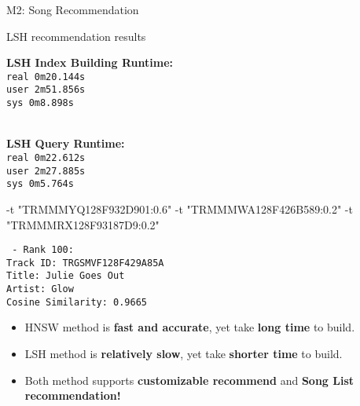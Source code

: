 \documentclass{beamer}
\begin{document}
\begin{section}{M2: Song Recommendation}
\begin{frame}[fragile]{LSH recommendation results}
    \begin{minipage}[b]{0.5\linewidth}
        \textbf{LSH Index Building Runtime:} \\
        \centering
        \texttt{real    0m20.144s} \\
        \texttt{user    2m51.856s} \\
        \texttt{sys     0m8.898s}
    \end{minipage}%
    \begin{minipage}[b]{0.5\linewidth}\\
        \textbf{LSH Query Runtime:} \\
        \centering
        \texttt{real    0m22.612s} \\
        \texttt{user    2m27.885s} \\
        \texttt{sys     0m5.764s}
    \end{minipage}
    \begin{minipage}[b]{0.5\linewidth}
        \vspace{1.0cm}
        \begin{bashcode}
-t "TRMMMYQ128F932D901:0.6" 
-t "TRMMMWA128F426B589:0.2" 
-t "TRMMMRX128F93187D9:0.2"
        \end{bashcode}
    \end{minipage}%
    \begin{minipage}[b]{0.5\linewidth}
        \centering
        \texttt{
  - Rank 100:\\
    Track ID: TRGSMVF128F429A85A\\
    Title: Julie Goes Out\\
    Artist: Glow\\
    Cosine Similarity: 0.9665}
    \end{minipage}
    \begin{itemize}
        \item HNSW method is \textbf{fast and accurate}, yet take \textbf{long time} to build.
        \item LSH method is \textbf{relatively slow}, yet take \textbf{shorter time} to build.
        \item Both method supports \textbf{customizable recommend} and \textbf{Song List recommendation!}
    \end{itemize}
\end{frame}

\end{section}
\end{document}
